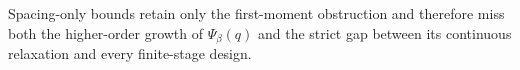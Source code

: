 Spacing-only bounds retain only the first-moment obstruction and therefore miss both the higher-order growth of \(\Psi_\beta(q)\) and the strict gap between its continuous relaxation and every finite-stage design.